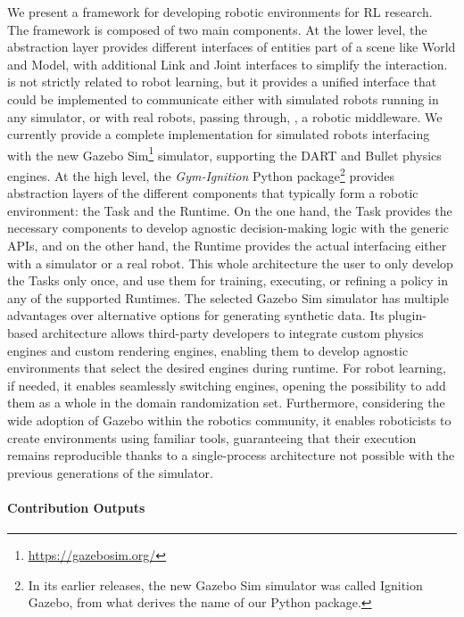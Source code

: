 We present a framework for developing robotic environments for \acl{RL} research.
The framework is composed of two main components.
At the lower level, the \scenario \cpp abstraction layer provides different interfaces of entities part of a scene like World and Model, with additional Link and Joint interfaces to simplify the interaction.
\scenario is not strictly related to robot learning, but it provides a unified interface that could be implemented to communicate either with simulated robots running in any simulator, or with real robots, passing through, \eg, a robotic middleware.
We currently provide a complete implementation for simulated robots interfacing with the new Gazebo Sim\footnote{\url{https://gazebosim.org/}} simulator, supporting the DART and Bullet physics engines.
At the high level, the \emph{Gym-Ignition} Python package\footnote{In its earlier releases, the new Gazebo Sim simulator was called Ignition Gazebo, from what derives the name of our Python package.} provides abstraction layers of the different components that typically form a robotic environment: the Task and the Runtime.
On the one hand, the Task provides the necessary components to develop agnostic decision-making logic with the generic \scenario \acp{API}, and on the other hand, the Runtime provides the actual interfacing either with a simulator or a real robot.
This whole architecture the user to only develop the Tasks only once, and use them for training, executing, or refining a policy in any of the supported Runtimes.
The selected Gazebo Sim simulator has multiple advantages over alternative options for generating synthetic data.
Its plugin-based architecture allows third-party developers to integrate custom physics engines and custom rendering engines, enabling them to develop agnostic environments that select the desired engines during runtime.
For robot learning, if needed, it enables seamlessly switching engines, opening the possibility to add them as a whole in the domain randomization set.
Furthermore, considering the wide adoption of Gazebo within the robotics community, it enables roboticists to create environments using familiar tools, guaranteeing that their execution remains reproducible thanks to a single-process architecture not possible with the previous generations of the simulator.

\paragraph{Contribution Outputs}

